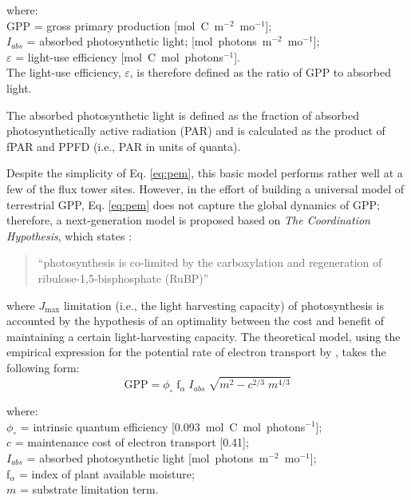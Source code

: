 \noindent where:\\
\indent GPP = gross primary production [mol~C~m$^{-2}$~mo$^{-1}$];\\
\indent $I_{abs}$ = absorbed photosynthetic light; [mol~photons~m$^{-2}$~mo$^{-1}$];\\
\indent $\varepsilon$ = light-use efficiency [mol~C~mol~photons$^{-1}$].\\

\noindent The light-use efficiency, $\varepsilon$, is therefore defined as the ratio of GPP to absorbed light. 

The absorbed photosynthetic light is defined as the fraction of absorbed photosynthetically active radiation (PAR) and is calculated as the product of fPAR and PPFD (i.e., PAR in units of quanta).

Despite the simplicity of Eq. \ref{eq:pem}, this basic model performs rather well at a few of the flux tower sites. 
However, in the effort of building a universal model of terrestrial GPP, Eq. \ref{eq:pem} does not capture the global dynamics of GPP; therefore, a next-generation model is proposed based on \emph{The Coordination Hypothesis}, which states \parencite{maire12}:
\begin{quote}
	``photosynthesis is co-limited by the carboxylation and regeneration of ribulose-1,5-bisphosphate (RuBP)''
\end{quote}
where $J_\text{max}$ limitation (i.e., the light harvesting capacity) of photosynthesis is accounted by the hypothesis of an optimality between the cost and benefit of maintaining a certain light-harvesting capacity.
The theoretical model, using the empirical expression for the potential rate of electron transport by \cite{smith37}, takes the following form:
\begin{equation}
\label{eq:nglue}
    \text{GPP} = \phi_{\circ}\; \text{f}_\alpha\; I_{abs}\; \sqrt{m^2 - c^{2/3}\; m^{4/3}}
\end{equation}

\noindent where:\\
\indent $\phi_{\circ}$ = intrinsic quantum efficiency [0.093~mol~C~mol~photons$^{-1}$];\\
\indent $c$ = maintenance cost of electron transport [0.41];\\
\indent $I_{abs}$ = absorbed photosynthetic light [mol~photons~m$^{-2}$~mo$^{-1}$];\\
\indent f$_\alpha$ = index of plant available moisture;\\
\indent $m$ = substrate limitation term.\\

